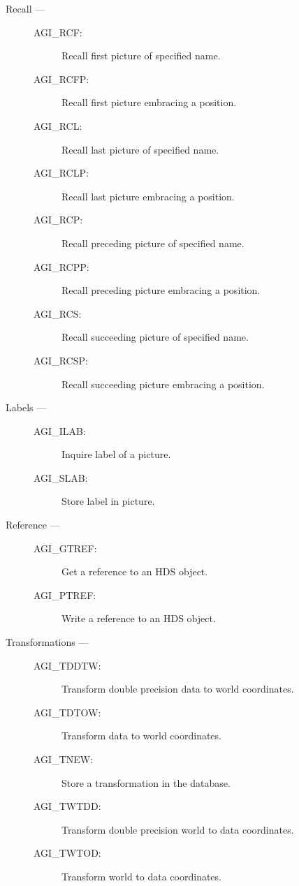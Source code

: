 \begin{description}
\item [Recall ---]

\begin{description}
\item [AGI\_RCF:]  Recall first picture of specified name.
\item [AGI\_RCFP:]  Recall first picture embracing a position.
\item [AGI\_RCL:]  Recall last picture of specified name.
\item [AGI\_RCLP:]  Recall last picture embracing a position.
\item [AGI\_RCP:]  Recall preceding picture of specified name.
\item [AGI\_RCPP:]  Recall preceding picture embracing a position.
\item [AGI\_RCS:]  Recall succeeding picture of specified name.
\item [AGI\_RCSP:]  Recall succeeding picture embracing a position.
\end{description}

\item [Labels ---]

\begin{description}
\item [AGI\_ILAB:]  Inquire label of a picture.
\item [AGI\_SLAB:]  Store label in picture.
\end{description}

\item [Reference ---]

\begin{description}
\item [AGI\_GTREF:]  Get a reference to an HDS object.
\item [AGI\_PTREF:]  Write a reference to an HDS object.
\end{description}

\item [Transformations ---]

\begin{description}
\item [AGI\_TDDTW:]  Transform double precision data to world coordinates.
\item [AGI\_TDTOW:]  Transform data to world coordinates.
\item [AGI\_TNEW:]  Store a transformation in the database.
\item [AGI\_TWTDD:]  Transform double precision world to data coordinates.
\item [AGI\_TWTOD:]  Transform world to data coordinates.
\end{description}


\end{description}

